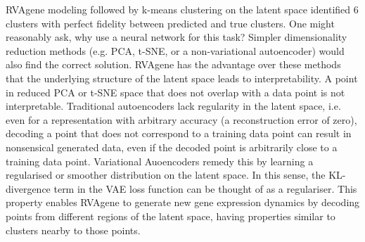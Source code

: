 RVAgene modeling followed by k-means clustering on the latent space identified 6 clusters with perfect fidelity between predicted and true clusters. One might reasonably ask, why use a neural network for this task? Simpler dimensionality reduction methods (e.g. PCA, t-SNE, or a non-variational autoencoder) would also find the correct solution. RVAgene has the advantage over these methods that the underlying structure of the latent space leads to interpretability. A point in reduced PCA or t-SNE space that does not overlap with a data point is not interpretable. Traditional autoencoders lack regularity in the latent space, i.e. even for a representation with arbitrary accuracy (a reconstruction error of zero), decoding a point that does not correspond to a training data point can result in nonsensical generated data, even if the decoded point is arbitrarily close to a training data point. Variational Auoencoders remedy this by learning a regularised or smoother distribution on the latent space. In this sense, the KL-divergence term in the VAE loss function can be thought of as a regulariser. This property enables RVAgene to generate new gene expression dynamics by decoding points from different regions of the latent space, having properties similar to clusters nearby to those points.


